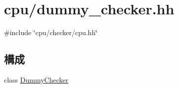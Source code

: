 \hypertarget{dummy__checker_8hh}{
\section{cpu/dummy\_\-checker.hh}
\label{dummy__checker_8hh}
}
{\ttfamily \#include \char`\"{}cpu/checker/cpu.hh\char`\"{}}\par
\subsection*{構成}
\begin{DoxyCompactItemize}
\item 
class \hyperlink{classDummyChecker}{DummyChecker}
\end{DoxyCompactItemize}
